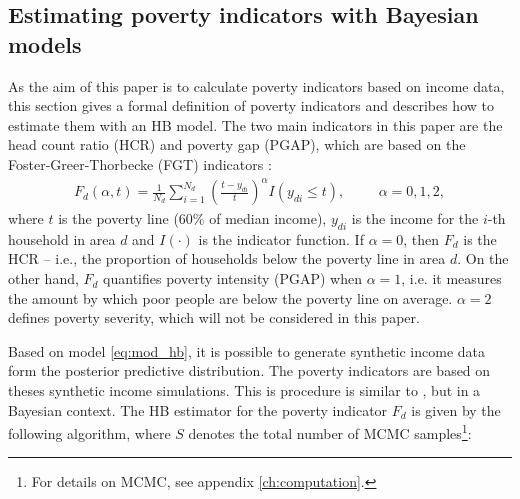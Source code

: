 \subsection{Estimating poverty indicators with Bayesian models}
\label{ch:indicators}

As the aim of this paper is to calculate poverty indicators based on income data,
this section gives a formal definition of poverty indicators and describes how to estimate them with an HB model.
The two main indicators in this paper are the head count ratio (HCR) and poverty gap (PGAP), which
are based on the Foster-Greer-Thorbecke (FGT) indicators \citep{foster_class_1984}:
\begin{gather*}
    F_d(\alpha, t) = \displaystyle \frac 1 {N_d} \sum_{i=1}^{N_d}\left( \frac{t - y_{di}}{t} \right)^\alpha I (y_{di} \le t),
    \hspace{1cm}\alpha = 0, 1, 2,
\end{gather*}
where $t$ is the poverty line (60\% of median income), $y_{di}$ is the income for the $i$-th household in area $d$ and $I(\cdot)$ is the indicator function.
If $\alpha = 0$, then $F_d$ is the HCR – i.e., the proportion of households below the poverty line in area $d$.
On the other hand, $F_d$ quantifies poverty intensity (PGAP) when $\alpha = 1$, i.e. it measures the amount by which poor people are below the poverty line on average.
$\alpha = 2$ defines poverty severity, which will not be considered in this paper.

Based on model \ref{eq:mod_hb}, it is possible to generate synthetic income data form the posterior predictive distribution.
The poverty indicators are based on theses synthetic income simulations.
This is procedure is similar to \cite{rojas_perilla_data_2020}, but in a Bayesian context.
The HB estimator for the poverty indicator $F_d$ is given by the following algorithm, where $S$ denotes the total number of MCMC samples\footnote{For details on MCMC, see appendix \ref{ch:computation}.}:

\newpage

